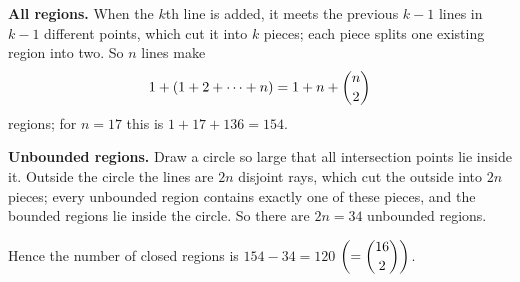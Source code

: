 \textbf{All regions.} When the $k$th line is added, it meets the previous $k-1$ lines in $k-1$ different points, which cut it into $k$ pieces; each piece splits one existing region into two. So $n$ lines make
\[
1+(1+2+\cdots+n)=1+n+\dbinom n2
\]
regions; for $n=17$ this is $1+17+136=154$.

\textbf{Unbounded regions.} Draw a circle so large that all intersection points lie inside it. Outside the circle the lines are $2n$ disjoint rays, which cut the outside into $2n$ pieces; every unbounded region contains exactly one of these pieces, and the bounded regions lie inside the circle. So there are $2n=34$ unbounded regions.

Hence the number of closed regions is $154-34=\boxed{120}$ $\left(=\dbinom{16}{2}\right)$.
